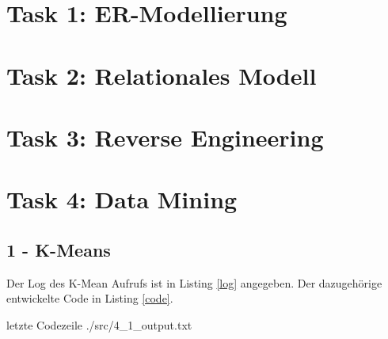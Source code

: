 
\newcommand{\dozent}{Prof. Dr. Agnès Voisard \\ Nicolas Lehmann}					%
\newcommand{\tutor}{Toni Draßdo}						%
\newcommand{\tutoriumNo}{014}				%
\newcommand{\ubungNo}{04}									%
\newcommand{\veranstaltung}{Datenbanksysteme}	%
\newcommand{\semester}{SoSe 18}						%
\newcommand{\studenten}{Eduard Beiline, Mark Niehues, Antoen Oehler}			%

\usepackage[normalem]{ulem}





\section*{Task 1: ER-Modellierung}


\section*{Task 2: Relationales Modell}


\section*{Task 3: Reverse Engineering}

\section*{Task 4: Data Mining}
\subsection*{1 - K-Means}
Der Log des K-Mean Aufrufs ist in Listing \ref{log} angegeben. Der dazugehörige entwickelte Code in Listing \ref{code}.

 letzte Codezeile
{./src/4_1_output.txt}

